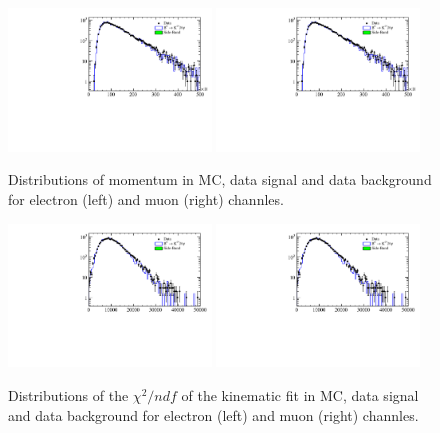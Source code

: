 \begin{figure}[h!]
\centering
\includegraphics[width=0.48\textwidth]{RKst/figs/MC_data_comp/EE/drawVariables_B0_P.pdf}
\includegraphics[width=0.48\textwidth]{RKst/figs/MC_data_comp/MM/drawVariables_B0_P.pdf}
\caption{ Distributions of \Bz momentum in MC, data signal and data background for electron (left) and muon (right) channles.   }
\end{figure}

\begin{figure}[h!]
\centering
\includegraphics[width=0.48\textwidth]{RKst/figs/MC_data_comp/EE/drawVariables_B0_PT.pdf}
\includegraphics[width=0.48\textwidth]{RKst/figs/MC_data_comp/MM/drawVariables_B0_PT.pdf}
\caption{ Distributions of the $\chi^2/ndf$ of the kinematic fit in MC, data signal and data background for electron (left) and muon (right) channles.   }
\end{figure}

